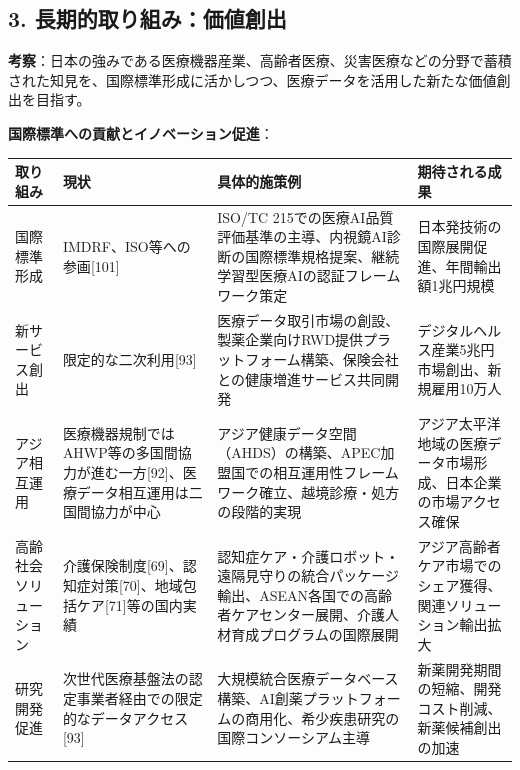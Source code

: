 \documentclass[
  a4paper,
  a4paper,
  11pt]{ltjsbook}
\begin{document}
\subsection{3.
長期的取り組み：価値創出}\label{ux9577ux671fux7684ux53d6ux308aux7d44ux307fux4fa1ux5024ux5275ux51fa}

\textbf{考察}：日本の強みである医療機器産業、高齢者医療、災害医療などの分野で蓄積された知見を、国際標準形成に活かしつつ、医療データを活用した新たな価値創出を目指す。

\textbf{国際標準への貢献とイノベーション促進}：

\begin{longtable}[]{@{}
  >{\raggedright\arraybackslash}p{}
  >{\raggedright\arraybackslash}p{}
  >{\raggedright\arraybackslash}p{}
  >{\raggedright\arraybackslash}p{}@{}}
\toprule\noalign{}
\begin{minipage}[b]{\linewidth}\raggedright
取り組み
\end{minipage} & \begin{minipage}[b]{\linewidth}\raggedright
現状
\end{minipage} & \begin{minipage}[b]{\linewidth}\raggedright
具体的施策例
\end{minipage} & \begin{minipage}[b]{\linewidth}\raggedright
期待される成果
\end{minipage} \\
\midrule\noalign{}
\endhead
\bottomrule\noalign{}
\endlastfoot
国際標準形成 & IMDRF、ISO等への参画{[}101{]} & ISO/TC
215での医療AI品質評価基準の主導、内視鏡AI診断の国際標準規格提案、継続学習型医療AIの認証フレームワーク策定
& 日本発技術の国際展開促進、年間輸出額1兆円規模 \\
新サービス創出 & 限定的な二次利用{[}93{]} &
医療データ取引市場の創設、製薬企業向けRWD提供プラットフォーム構築、保険会社との健康増進サービス共同開発
& デジタルヘルス産業5兆円市場創出、新規雇用10万人 \\
アジア相互運用 &
医療機器規制ではAHWP等の多国間協力が進む一方{[}92{]}、医療データ相互運用は二国間協力が中心
&
アジア健康データ空間（AHDS）の構築、APEC加盟国での相互運用性フレームワーク確立、越境診療・処方の段階的実現
& アジア太平洋地域の医療データ市場形成、日本企業の市場アクセス確保 \\
高齢社会ソリューション &
介護保険制度{[}69{]}、認知症対策{[}70{]}、地域包括ケア{[}71{]}等の国内実績
&
認知症ケア・介護ロボット・遠隔見守りの統合パッケージ輸出、ASEAN各国での高齢者ケアセンター展開、介護人材育成プログラムの国際展開
& アジア高齢者ケア市場でのシェア獲得、関連ソリューション輸出拡大 \\
研究開発促進 &
次世代医療基盤法の認定事業者経由での限定的なデータアクセス{[}93{]} &
大規模統合医療データベース構築、AI創薬プラットフォームの商用化、希少疾患研究の国際コンソーシアム主導
& 新薬開発期間の短縮、開発コスト削減、新薬候補創出の加速 \\
\end{longtable}
\end{document}
